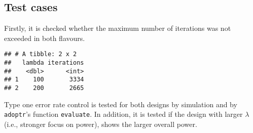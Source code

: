 \documentclass[
]{book}
\newenvironment{Shaded}{\begin{snugshade}}{\end{snugshade}}
\newcommand{\DataTypeTok}[1]{\textcolor[rgb]{0.13,0.29,0.53}{#1}}
\newcommand{\KeywordTok}[1]{\textcolor[rgb]{0.13,0.29,0.53}{\textbf{#1}}}
\newcommand{\NormalTok}[1]{#1}
\newcommand{\OperatorTok}[1]{\textcolor[rgb]{0.81,0.36,0.00}{\textbf{#1}}}
\newcommand{\StringTok}[1]{\textcolor[rgb]{0.31,0.60,0.02}{#1}}
\begin{document}
\hypertarget{test-cases-11}{%
\subsection{Test cases}\label{test-cases-11}}

Firstly, it is checked whether the maximum number of iterations was not
exceeded in both flavours.

\begin{Shaded}
\end{Shaded}

\begin{verbatim}
## # A tibble: 2 x 2
##   lambda iterations
##    <dbl>      <int>
## 1    100       3334
## 2    200       2665
\end{verbatim}

Type one error rate control is tested for both designs by simulation and by
\texttt{adoptr}'s function \texttt{evaluate}.
In addition, it is tested if the design with larger \(\lambda\) (i.e.,
stronger focus on power), shows the larger overall power.
\end{document}
